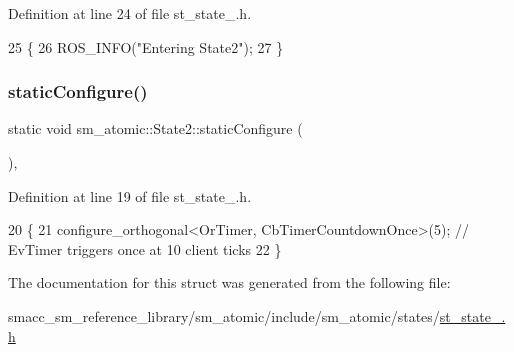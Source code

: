 Definition at line 24 of file st\+\_\+state\+\_.\+h.


\begin{DoxyCode}
25     \{
26         ROS\_INFO(\textcolor{stringliteral}{"Entering State2"});
27     \}
\end{DoxyCode}
\mbox{\label{structsm__atomic_1_1State2_ab6cafa3e8433c2d7ee10fa6fec8f3748}} 
\subsubsection{\texorpdfstring{static\+Configure()}{staticConfigure()}}
{\footnotesize\ttfamily static void sm\+\_\+atomic\+::\+State2\+::static\+Configure (\begin{DoxyParamCaption}{ }\end{DoxyParamCaption})\hspace{0.3cm}{\ttfamily [inline]}, {\ttfamily [static]}}



Definition at line 19 of file st\+\_\+state\+\_.\+h.


\begin{DoxyCode}
20     \{
21         configure\_orthogonal<OrTimer, CbTimerCountdownOnce>(5); \textcolor{comment}{// EvTimer triggers once at 10 client ticks}
22     \}
\end{DoxyCode}


The documentation for this struct was generated from the following file\+:\begin{DoxyCompactItemize}
\item 
smacc\+\_\+sm\+\_\+reference\+\_\+library/sm\+\_\+atomic/include/sm\+\_\+atomic/states/\hyperlink{sm__atomic_2include_2sm__atomic_2states_2st__state__2_8h}{st\+\_\+state\+\_.\+h}\end{DoxyCompactItemize}
